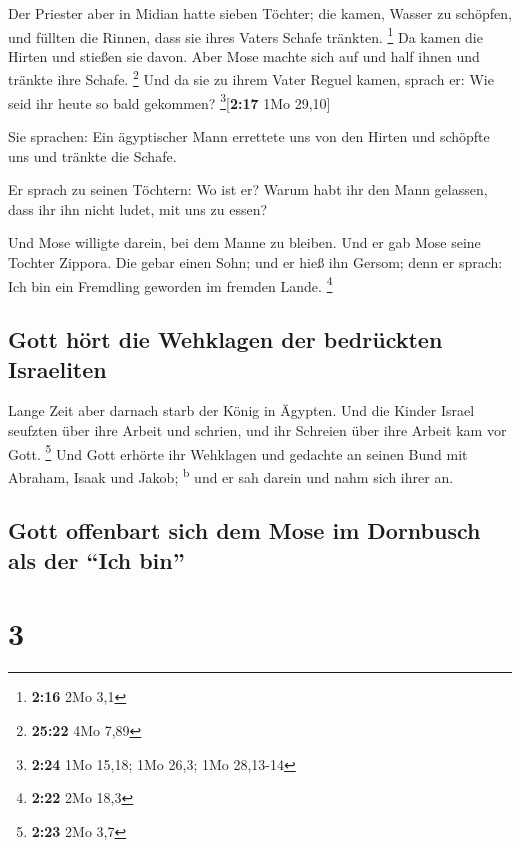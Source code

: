  Der Priester aber in Midian hatte sieben Töchter; die
kamen, Wasser zu schöpfen, und füllten die Rinnen, dass sie ihres Vaters
Schafe tränkten. \footnote{\textbf{2:16} 2Mo 3,1}  Da
kamen die Hirten und stießen sie davon. Aber Mose machte sich auf und
half ihnen und tränkte ihre Schafe. \footnote{\textbf{25:22} 4Mo 7,89}
 Und da sie zu ihrem Vater Reguel kamen, sprach er: Wie
seid ihr heute so bald gekommen? \footnote{\textbf{2:24} 1Mo 15,18; 1Mo
  26,3; 1Mo 28,13-14}{[}\textbf{2:17} 1Mo 29,10{]}

 Sie sprachen: Ein ägyptischer Mann errettete uns von den
Hirten und schöpfte uns und tränkte die Schafe.

 Er sprach zu seinen Töchtern: Wo ist er? Warum habt ihr
den Mann gelassen, dass ihr ihn nicht ludet, mit uns zu essen?

 Und Mose willigte darein, bei dem Manne zu bleiben. Und
er gab Mose seine Tochter Zippora.  Die gebar einen Sohn;
und er hieß ihn Gersom; denn er sprach: Ich bin ein Fremdling geworden
im fremden Lande. \footnote{\textbf{2:22} 2Mo 18,3}

\hypertarget{gott-huxf6rt-die-wehklagen-der-bedruxfcckten-israeliten}{%
\subsection{Gott hört die Wehklagen der bedrückten
Israeliten}\label{gott-huxf6rt-die-wehklagen-der-bedruxfcckten-israeliten}}

 Lange Zeit aber darnach starb der König in Ägypten. Und
die Kinder Israel seufzten über ihre Arbeit und schrien, und ihr
Schreien über ihre Arbeit kam vor Gott. \footnote{\textbf{2:23} 2Mo 3,7}
 Und Gott erhörte ihr Wehklagen und gedachte an seinen
Bund mit Abraham, Isaak und Jakob; \textsuperscript{b} 
und er sah darein und nahm sich ihrer an.

\hypertarget{gott-offenbart-sich-dem-mose-im-dornbusch-als-der-ich-bin}{%
\subsection{Gott offenbart sich dem Mose im Dornbusch als der ``Ich
bin''}\label{gott-offenbart-sich-dem-mose-im-dornbusch-als-der-ich-bin}}

\hypertarget{section-2}{%
\section{3}\label{section-2}}

